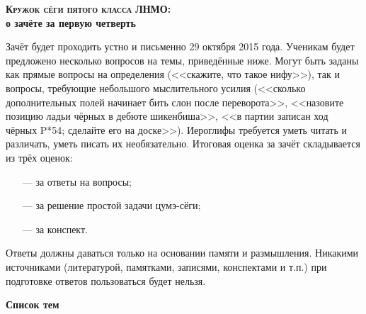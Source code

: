 \documentclass[12pt]{article}
\begin{document}
\begin{CJK}{UTF8}{min}
\begin{center}{\bfseries\Large{\scshape Кружок сёги пятого класса ЛНМО:}\\\medbreak о зачёте за первую четверть}\end{center}

\vspace{0.3cm}
\noindent Зачёт будет проходить устно и письменно 29 октября 2015 года. Ученикам будет предложено несколько
вопросов на темы, приведённые ниже. Могут быть заданы как прямые вопросы на определения 
(<<скажите, что такое нифу>>), так и вопросы, требующие небольшого мыслительного усилия 
(<<сколько дополнительных полей начинает бить слон после переворота>>, 
<<назовите позицию ладьи чёрных в дебюте шикенбиша>>, <<в партии записан ход чёрных P*54; сделайте его на доске>>).
Иероглифы требуется уметь читать и различать, уметь писать их необязательно.
\bigbreak
\noindent Итоговая оценка за зачёт складывается из трёх оценок:
\begin{itemize}
\setlength{\parskip}{-1ex}\relax
\item[---] за ответы на вопросы;
\item[---] за решение простой задачи цумэ-сёги;
\item[---] за конспект.
\end{itemize}

\bigbreak
\noindent Ответы должны даваться только на основании памяти и размышления.
Никакими источниками (литературой, памятками, записями, конспектами и т.п.) при подготовке
ответов пользоваться будет нельзя.

\bigbreak
\begin{center}\bfseries\large Список тем\end{center}


\end{CJK}
\end{document}
